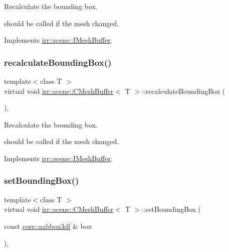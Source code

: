 Recalculate the bounding box. 

should be called if the mesh changed. 

Implements \hyperlink{classirr_1_1scene_1_1IMeshBuffer_a161877fc3afe29a816440db12a71785d}{irr\+::scene\+::\+I\+Mesh\+Buffer}.

\mbox{\label{classirr_1_1scene_1_1CMeshBuffer_aad55263eaf019b090c8d1c3c5f7f4407}} 
\subsubsection{\texorpdfstring{recalculate\+Bounding\+Box()}{recalculateBoundingBox()}\hspace{0.1cm}{\footnotesize\ttfamily [2/2]}}
{\footnotesize\ttfamily template$<$class T $>$ \\
virtual void \hyperlink{classirr_1_1scene_1_1CMeshBuffer}{irr\+::scene\+::\+C\+Mesh\+Buffer}$<$ T $>$\+::recalculate\+Bounding\+Box (\begin{DoxyParamCaption}{ }\end{DoxyParamCaption})\hspace{0.3cm}{\ttfamily [inline]}, {\ttfamily [virtual]}}



Recalculate the bounding box. 

should be called if the mesh changed. 

Implements \hyperlink{classirr_1_1scene_1_1IMeshBuffer_a161877fc3afe29a816440db12a71785d}{irr\+::scene\+::\+I\+Mesh\+Buffer}.

\mbox{\label{classirr_1_1scene_1_1CMeshBuffer_ab5a21d48a5af73f1ef880a48c3798a67}} 
\subsubsection{\texorpdfstring{set\+Bounding\+Box()}{setBoundingBox()}\hspace{0.1cm}{\footnotesize\ttfamily [1/2]}}
{\footnotesize\ttfamily template$<$class T $>$ \\
virtual void \hyperlink{classirr_1_1scene_1_1CMeshBuffer}{irr\+::scene\+::\+C\+Mesh\+Buffer}$<$ T $>$\+::set\+Bounding\+Box (\begin{DoxyParamCaption}\item[{const \hyperlink{namespaceirr_1_1core_a60f4b4c744aba55f10530d503c6ecb04}{core\+::aabbox3df} \&}]{box }\end{DoxyParamCaption})\hspace{0.3cm}{\ttfamily [inline]}, {\ttfamily [virtual]}}



